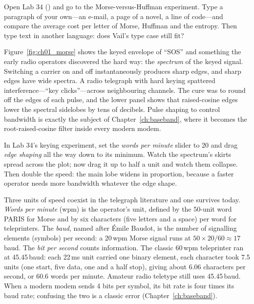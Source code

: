 \begin{tryit}
Open Lab 34 () and go to the Morse-versus-Huffman experiment. Type
a paragraph of your own---an e-mail, a page of a novel, a line of code---and compare the average cost
per letter of Morse, Huffman and the entropy. Then type text in another language: does Vail's type
case still fit?
\end{tryit}

Figure~\ref{fig:ch01_morse} shows the keyed envelope of ``SOS'' and something the early radio
operators discovered the hard way: the \emph{spectrum} of the keyed signal. Switching a carrier on and
off instantaneously produces sharp edges, and sharp edges have wide spectra. A radio telegraph with
hard keying spattered interference---``key clicks''---across neighbouring channels. The cure was to
round off the edges of each pulse, and the lower panel shows that raised-cosine edges lower the
spectral sidelobes by tens of decibels. Pulse shaping to control bandwidth is exactly the subject of
Chapter~\ref{ch:baseband}, where it becomes the root-raised-cosine filter inside every modern modem.


\begin{tryit}
In Lab 34's keying experiment, set the \emph{words per minute} slider to 20 and drag \emph{edge
shaping} all the way down to its minimum. Watch the spectrum's skirts spread across the plot; now
drag it up to half a unit and watch them collapse. Then double the speed: the main lobe widens in
proportion, because a faster operator needs more bandwidth whatever the edge shape.
\end{tryit}

\begin{inpractice}
Three units of speed coexist in the telegraph literature and one survives today. \emph{Words per
minute} (wpm) is the operator's unit, defined by the 50-unit word PARIS for Morse and by
six characters (five letters and a space) per word for teleprinters. The \emph{baud}, named after
\'Emile Baudot, is the number of signalling elements (symbols) per second: a 20\,wpm Morse signal
runs at $50\times20/60\approx17$\,baud. The \emph{bit per second} counts information. The
classic 60\,wpm teleprinter ran at 45.45\,baud: each 22\,ms unit carried one binary element, each
character took 7.5 units (one start, five data, one and a half stop), giving about 6.06 characters
per second, or 60.6 words per minute. Amateur radio teletype still uses 45.45\,baud. When a modern
modem sends 4 bits per symbol, its bit rate is four times its baud rate; confusing the two is a
classic error (Chapter~\ref{ch:baseband}).
\end{inpractice}


